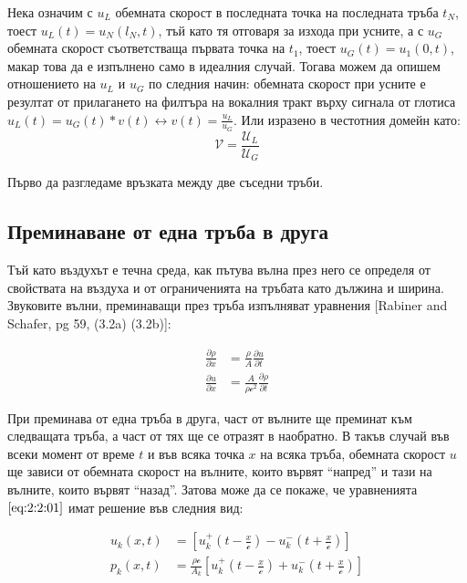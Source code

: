 \documentclass[12pt]{report}
\numberwithin{equation}{section}
\numberwithin{figure}{section}
\newcommand{\B}[1]{\left(#1\right)}
\newcommand{\Q}[1]{\left[#1\right]}
\begin{document}
    Нека означим с $u_L$ обемната скорост в последната точка на последната тръба $t_N$, тоест $u_L(t) = u_N(l_N, t)$, тъй като тя отговаря за изхода при усните, 
    а с $u_G$ обемната скорост съответстваща първата точка на $t_1$, тоест $u_G(t) = u_1(0, t)$, макар това да е изпълнено само в идеалния случай.
    Тогава можем да опишем отношението на $u_L$ и $u_G$ по следния начин: обемната скорост при усните е резултат от прилагането на филтъра на вокалния тракт върху сигнала
    от глотиса  $u_L(t) = u_G(t)\ast v(t) \longleftrightarrow v(t) = \frac{u_L}{u_G}$.
    Или изразено в честотния домейн като:
    \[
        \mathcal{V} = \frac{\mathcal{U}_L}{\mathcal{U}_G}
    \]

    Първо да разгледаме връзката между две съседни тръби.
    
    \subsection{Преминаване от една тръба в друга}

    Тъй като въздухът е течна среда, как пътува вълна през него се определя от свойствата на въздуха и от ограниченията на тръбата като дължина и ширина. Звуковите вълни, преминаващи през
    тръба изпълняват уравнения [Rabiner and Schafer, pg 59, (3.2a) (3.2b)]:
    
    \begin{subequations}
        \label{eq:2:2:01}
        \begin{align}
            \label{eq:2:2:01:a} \frac{\partial\rho}{\partial x} & = \frac{\rho}{A} \frac{\partial u}{\partial t}\\
            \label{eq:2:2:01:b} \frac{\partial u}{\partial x} & = \frac{A}{\rho \mathcal{c}^2} \frac{\partial \rho}{\partial t}
        \end{align}
    \end{subequations}

    При преминава от една тръба в друга, част от вълните ще преминат към следващата тръба, а част от тях ще се отразят в наобратно.
    В такъв случай във всеки момент от време $t$ и във всяка точка $x$ на всяка тръба,
    обемната скорост $u$ ще зависи от обемната скорост на вълните,
    които вървят ``напред'' и тази на вълните, които вървят ``назад''.
    Затова може да се покаже, че уравненията $\eqref{eq:2:2:01}$ имат решение във следния вид:

    \begin{subequations}
        \label{eq:2:2:02}
        \begin{align}
            u_{k}(x, t) & = \Q{u_{k}^{+}\B{t - \frac{x}{\mathcal{c}}} - u_{k}^{-}\B{t + \frac{x}{\mathcal{c}}}}\\
            p_{k}(x, t) & = \frac{\rho \mathcal{c}}{A_{k}} \Q{u_{k}^{+}\B{t - \frac{x}{\mathcal{c}}} + u_{k}^{-}\B{t + \frac{x}{\mathcal{c}}}}
        \end{align}
    \end{subequations}
\end{document}
